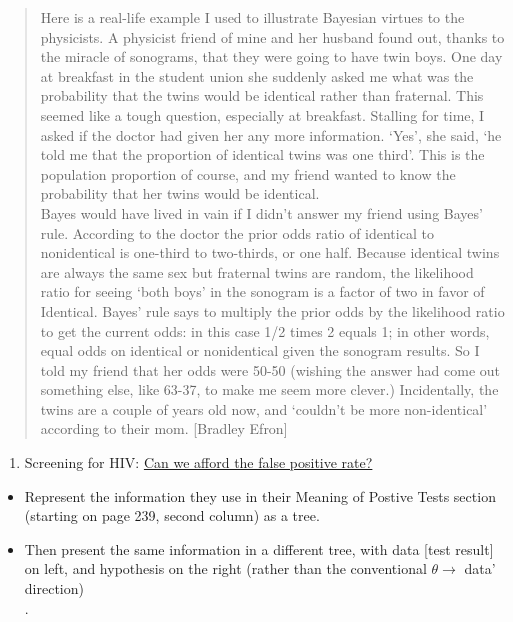 \documentclass[]{book}
\providecommand{\tightlist}{%
  \setlength{\itemsep}{0pt}\setlength{\parskip}{0pt}}
\begin{document}
\begin{quote}
Here is a real-life example I used to illustrate Bayesian virtues to the physicists. A physicist friend of mine and her husband found out, thanks to the miracle of sonograms, that they were going to have twin boys. One day at breakfast in the student union she suddenly asked me what was the probability that the twins would be identical rather than fraternal. This seemed like a tough question, especially at breakfast. Stalling for time, I asked if the doctor had given her any more information. `Yes', she said, `he told me that the proportion of identical twins was one third'. This is the population proportion of course, and my friend wanted to know the probability that her twins would be identical.\\
Bayes would have lived in vain if I didn't answer my friend using Bayes' rule. According to the doctor the prior odds ratio of identical to nonidentical is one-third to two-thirds, or one half. Because identical twins are always the same sex but fraternal twins are random, the likelihood ratio for seeing `both boys' in the sonogram is a factor of two in favor of Identical. Bayes' rule says to multiply the prior odds by the likelihood ratio to get the current odds: in this case 1/2 times 2 equals 1; in other words, equal odds on identical or nonidentical given the sonogram results. So I told my friend that her odds were 50-50 (wishing the answer had come out something else, like 63-37, to make me seem more clever.) Incidentally, the twins are a couple of years old now, and `couldn't be more non-identical' according to their mom. {[}Bradley Efron{]}
\end{quote}

\begin{enumerate}
\def\labelenumi{\arabic{enumi}.}
\setcounter{enumi}{9}
\tightlist
\item
  Screening for HIV: \href{http://www.medicine.mcgill.ca/epidemiology/hanley/bios601/CandH-ch0102/MeyerPaukerHIVscreening.pdf}{Can we afford the false
  positive rate?}
\end{enumerate}

\begin{itemize}
\tightlist
\item
  Represent the information they use in their Meaning of Postive Tests section (starting on page 239, second column) as a tree.
\item
  Then present the same information in a different tree, with data {[}test result{]} on left, and hypothesis on the right
  (rather than the conventional \(\theta \rightarrow\) data' direction)\\
  .
\end{itemize}
\end{document}
